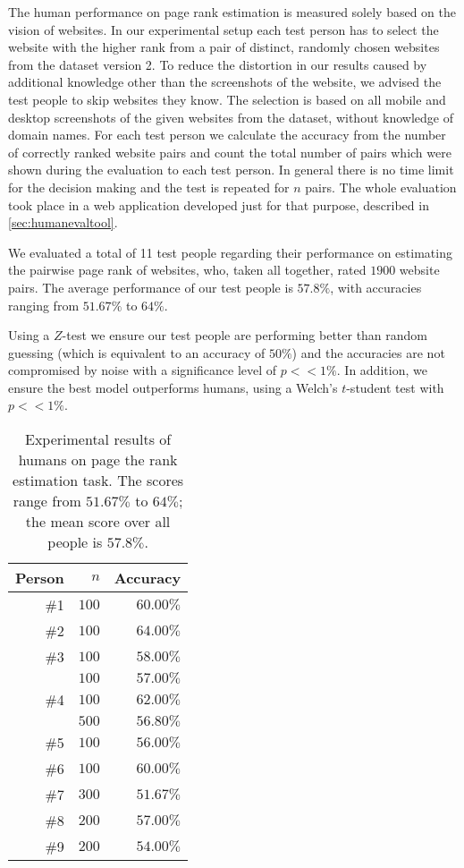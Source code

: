 The human performance on page rank estimation is measured solely based on the vision of websites. In our experimental setup each test person has to select the website with the higher rank from a pair of distinct, randomly chosen websites from the dataset version 2. To reduce the distortion in our results caused by additional knowledge other than the screenshots of the website, we advised the test people to skip websites they know. The selection is based on all mobile and desktop screenshots of the given websites from the dataset, without knowledge of domain names.
For each test person we calculate the accuracy from the number of correctly ranked website pairs and count the total number of pairs which were shown during the evaluation to each test person. In general there is no time limit for the decision making and the test is repeated for $n$ pairs.
The whole evaluation took place in a web application developed just for that purpose, described in \ref{sec:humanevaltool}.

We evaluated a total of 11 test people regarding their performance on estimating the pairwise page rank of websites, who, taken all together, rated $1900$ website pairs. The average performance of our test people is $57.8\%$, with accuracies ranging from $51.67\%$ to $64\%$.

Using a $Z$-test we ensure our test people are performing better than random guessing (which is equivalent to an accuracy of $50\%$) and the accuracies are not compromised by noise with a significance level of $p << 1\%$. In addition, we ensure the best model outperforms humans, using a Welch's $t$-student test with $p << 1\%$.

\begin{table}[]
	\center
	\begin{tabular}{r|r|r}
		\textbf{Person} & $n$ & \textbf{Accuracy} \\ \hline \hline
		\#1 & $100$ & $60.00\%$ \\ \hline
		\#2 & $100$ & $64.00\%$\\ \hline
		\#3 & $100$ & $58.00\%$\\ \hline
            & $100$ & $57.00\%$\\
        \#4 & $100$ & $62.00\%$\\
            & $500$ & $56.80\%$\\ \hline
		\#5 & $100$ & $56.00\%$\\ \hline
		\#6 & $100$ & $60.00\%$\\ \hline
		\#7 & $300$ & $51.67\%$\\ \hline
		\#8 & $200$ & $57.00\%$\\ \hline
		\#9 & $200$ & $54.00\%$\\
	\end{tabular}
	\caption[Experimental results of humans on the page rank estimation task]{Experimental results of humans on page the rank estimation task. The scores range from $51.67\%$ to $64\%$; the mean score over all people is $57.8\%$.}
\label{table_human_eval_results}
\end{table}

